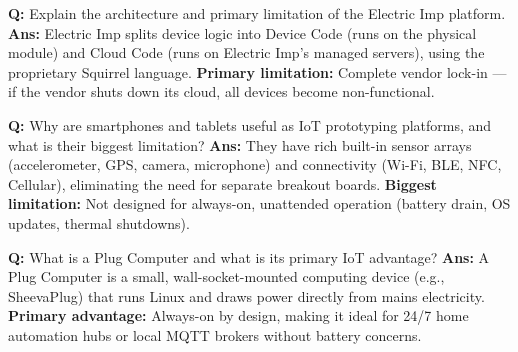 \documentclass[10pt,a4paper,twocolumn]{article}
\begin{document}
\begin{tcolorbox}[
  colback=white,
  colframe=UnitColorSix,
  colbacktitle=gray!10!white,
  coltitle=black,
  fonttitle=\bfseries\sffamily\small,
  title={Unit VI $\bullet$ Card 10},
  boxrule=1.2pt,
  arc=2mm,
  outer arc=2mm,
  boxsep=1.5mm,
  top=1mm,
  bottom=1mm,
  left=1.5mm,
  right=1.5mm,
  before skip=2.5mm,
  after skip=2.5mm
]
\textbf{Q:} Explain the architecture and primary limitation of the Electric Imp platform.
\tcbline
\textbf{Ans:} Electric Imp splits device logic into Device Code (runs on the physical module) and Cloud Code (runs on Electric Imp's managed servers), using the proprietary Squirrel language. \textbf{Primary limitation:} Complete vendor lock-in — if the vendor shuts down its cloud, all devices become non-functional.
\end{tcolorbox}


\begin{tcolorbox}[
  colback=white,
  colframe=UnitColorSix,
  colbacktitle=gray!10!white,
  coltitle=black,
  fonttitle=\bfseries\sffamily\small,
  title={Unit VI $\bullet$ Card 11},
  boxrule=1.2pt,
  arc=2mm,
  outer arc=2mm,
  boxsep=1.5mm,
  top=1mm,
  bottom=1mm,
  left=1.5mm,
  right=1.5mm,
  before skip=2.5mm,
  after skip=2.5mm
]
\textbf{Q:} Why are smartphones and tablets useful as IoT prototyping platforms, and what is their biggest limitation?
\tcbline
\textbf{Ans:} They have rich built-in sensor arrays (accelerometer, GPS, camera, microphone) and connectivity (Wi-Fi, BLE, NFC, Cellular), eliminating the need for separate breakout boards. \textbf{Biggest limitation:} Not designed for always-on, unattended operation (battery drain, OS updates, thermal shutdowns).
\end{tcolorbox}


\begin{tcolorbox}[
  colback=white,
  colframe=UnitColorSix,
  colbacktitle=gray!10!white,
  coltitle=black,
  fonttitle=\bfseries\sffamily\small,
  title={Unit VI $\bullet$ Card 12},
  boxrule=1.2pt,
  arc=2mm,
  outer arc=2mm,
  boxsep=1.5mm,
  top=1mm,
  bottom=1mm,
  left=1.5mm,
  right=1.5mm,
  before skip=2.5mm,
  after skip=2.5mm
]
\textbf{Q:} What is a Plug Computer and what is its primary IoT advantage?
\tcbline
\textbf{Ans:} A Plug Computer is a small, wall-socket-mounted computing device (e.g., SheevaPlug) that runs Linux and draws power directly from mains electricity. \textbf{Primary advantage:} Always-on by design, making it ideal for 24/7 home automation hubs or local MQTT brokers without battery concerns.
\end{tcolorbox}
\end{document}
